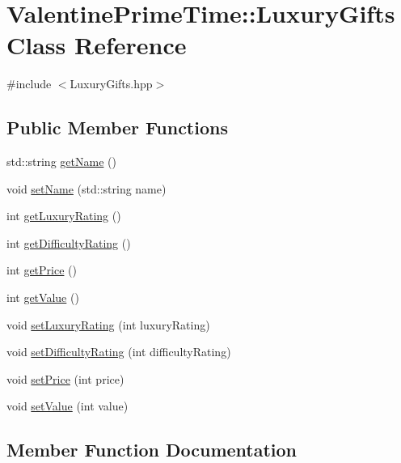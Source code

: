 \hypertarget{classValentinePrimeTime_1_1LuxuryGifts}{}\section{Valentine\+Prime\+Time\+:\+:Luxury\+Gifts Class Reference}
\label{classValentinePrimeTime_1_1LuxuryGifts}


{\ttfamily \#include $<$Luxury\+Gifts.\+hpp$>$}

\subsection*{Public Member Functions}
\begin{DoxyCompactItemize}
\item 
std\+::string \hyperlink{classValentinePrimeTime_1_1LuxuryGifts_ace4ca71b389a35ba4df9093d663fbd10}{get\+Name} ()
\item 
void \hyperlink{classValentinePrimeTime_1_1LuxuryGifts_a552a280b4dcba44b1303610ddb27a500}{set\+Name} (std\+::string name)
\item 
int \hyperlink{classValentinePrimeTime_1_1LuxuryGifts_a24f426ce01655f6f467f148ebe89cdf6}{get\+Luxury\+Rating} ()
\item 
int \hyperlink{classValentinePrimeTime_1_1LuxuryGifts_a56e2b1e26c91a43dfdd4ec724bb0c6d4}{get\+Difficulty\+Rating} ()
\item 
int \hyperlink{classValentinePrimeTime_1_1LuxuryGifts_a02c88093eec7aad550a0497c63b3cb3a}{get\+Price} ()
\item 
int \hyperlink{classValentinePrimeTime_1_1LuxuryGifts_a331d1d7d9111a8d4d043548422cd59dd}{get\+Value} ()
\item 
void \hyperlink{classValentinePrimeTime_1_1LuxuryGifts_a69a4dd3b5afc0f6341a4ee7e80db742f}{set\+Luxury\+Rating} (int luxury\+Rating)
\item 
void \hyperlink{classValentinePrimeTime_1_1LuxuryGifts_ac406b6a590ee04babab62e6434792142}{set\+Difficulty\+Rating} (int difficulty\+Rating)
\item 
void \hyperlink{classValentinePrimeTime_1_1LuxuryGifts_aafdde6ba41c11ee7adaf95b544de52a6}{set\+Price} (int price)
\item 
void \hyperlink{classValentinePrimeTime_1_1LuxuryGifts_a34ae41885f9b8a23560d10632beaf52f}{set\+Value} (int value)
\end{DoxyCompactItemize}


\subsection{Member Function Documentation}
